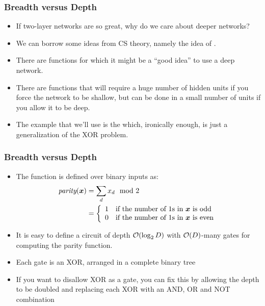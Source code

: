 \documentclass[trans]{beamer}
\begin{document}

\begin{frame}
  \frametitle{Breadth versus Depth}
\begin{itemize}
\item
If two-layer networks are so great, why do we care about
deeper networks?
\item
We can borrow some ideas from CS theory,
namely the idea of .  
\item There are functions for which it might be a ``good idea'' to use
a deep network. 
\item  There are functions that will require
a huge number of hidden units if you force the network to be shallow,
but can be done in a small number of units if you allow it to be
deep. 
\item  The example that we'll use is the 
which, ironically enough, is just a generalization of the XOR
problem.
\end{itemize}
\end{frame}

\begin{frame}
  \frametitle{Breadth versus Depth}
\begin{itemize}
\item
  The function is defined over binary inputs as:
%
\begin{align}
\textit{parity}({\boldsymbol{x}})
&= \sum_d x_d \mod 2 \\
&= \left\{\begin{array}{ll} 1 & \text{if the number of $1$s in ${\boldsymbol{x}}$ is odd} \\
           0 & \text{if the number of $1$s in ${\boldsymbol{x}}$ is even} \end{array}\right.
\end{align}
%
%
\item It is easy to define a circuit of depth $\mathcal{O}(\log_2 D)$ with
$\mathcal{O}(D)$-many gates for computing the parity function.
\item  Each gate is
an XOR, arranged in a complete binary tree
\item If you want to disallow XOR as a
gate, you can fix this by allowing the depth to be doubled and
replacing each XOR with an AND, OR and NOT combination
\end{itemize}
\end{frame}
\end{document}
